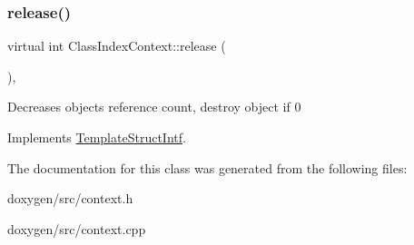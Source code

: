 \mbox{\label{class_class_index_context_ade13f5057c83883e9cb22b5ccd2eead6}} 
\subsubsection{\texorpdfstring{release()}{release()}}
{\footnotesize\ttfamily virtual int Class\+Index\+Context\+::release (\begin{DoxyParamCaption}{ }\end{DoxyParamCaption})\hspace{0.3cm}{\ttfamily [inline]}, {\ttfamily [virtual]}}

Decreases object\textquotesingle{}s reference count, destroy object if 0 

Implements \mbox{\hyperlink{class_template_struct_intf_a3dce7dd29d3f66a8080b40578e8a5045}{Template\+Struct\+Intf}}.



The documentation for this class was generated from the following files\+:\begin{DoxyCompactItemize}
\item 
doxygen/src/context.\+h\item 
doxygen/src/context.\+cpp\end{DoxyCompactItemize}
